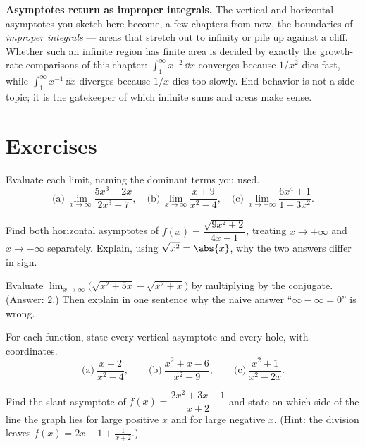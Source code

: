 \begin{connectionbox}
\textbf{Asymptotes return as improper integrals.} The vertical and horizontal
asymptotes you sketch here become, a few chapters from now, the boundaries of
\emph{improper integrals} --- areas that stretch out to infinity or pile up
against a cliff. Whether such an infinite region has finite area is decided by
exactly the growth-rate comparisons of this chapter: $\int_1^\infty x^{-2}\,\dd
x$ converges because $1/x^2$ dies fast, while $\int_1^\infty x^{-1}\,\dd x$
diverges because $1/x$ dies too slowly. End behavior is not a side topic; it is
the gatekeeper of which infinite sums and areas make sense.
\end{connectionbox}

\section{Exercises}
\label{ch09:exercises}

\begin{exercise}
Evaluate each limit, naming the dominant terms you used.
\[
\text{(a)}\ \lim_{x\to\infty}\frac{5x^3-2x}{2x^3+7},
\quad
\text{(b)}\ \lim_{x\to\infty}\frac{x+9}{x^2-4},
\quad
\text{(c)}\ \lim_{x\to-\infty}\frac{6x^4+1}{1-3x^2}.
\]
\end{exercise}

\begin{exercise}
Find both horizontal asymptotes of $f(x)=\dfrac{\sqrt{9x^2+2}}{4x-1}$, treating
$x\to+\infty$ and $x\to-\infty$ separately. Explain, using $\sqrt{x^2}=\abs{x}$,
why the two answers differ in sign.
\end{exercise}

\begin{exercise}
Evaluate $\displaystyle\lim_{x\to\infty}\bigl(\sqrt{x^2+5x}-\sqrt{x^2+x}\bigr)$
by multiplying by the conjugate. (Answer: $2$.) Then explain in one sentence why
the naive answer ``$\infty-\infty=0$'' is wrong.
\end{exercise}

\begin{exercise}
For each function, state every vertical asymptote and every hole, with
coordinates.
\[
\text{(a)}\ \frac{x-2}{x^2-4},
\qquad
\text{(b)}\ \frac{x^2+x-6}{x^2-9},
\qquad
\text{(c)}\ \frac{x^2+1}{x^2-2x}.
\]
\end{exercise}

\begin{exercise}
Find the slant asymptote of $f(x)=\dfrac{2x^2+3x-1}{x+2}$ and state on which side
of the line the graph lies for large positive $x$ and for large negative $x$.
(Hint: the division leaves $f(x)=2x-1+\frac{1}{x+2}$.)
\end{exercise}

